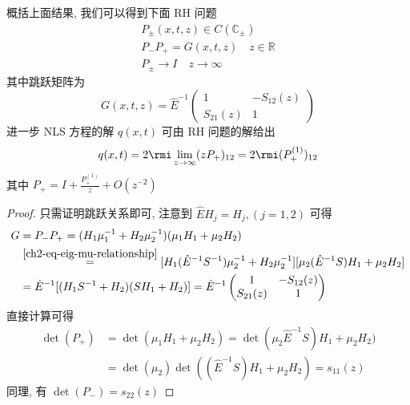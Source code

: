 \begin{definition}
    概括上面结果, 我们可以得到下面 RH 问题
    \begin{align}
        P_{\pm}(x,t,z) \in C(\mathbb{C}_{\pm})  \label{ch2-eq-RHP-1}      \\
        P_{-}P_{+} = G(x,t,z) \quad z \in \mathbb{R} \label{ch2-eq-RHP-2} \\
        P_{\pm} \to I \quad z \to \infty \label{ch2-eq-RHP-3}
    \end{align}
    其中跳跃矩阵为
    \begin{equation}
        G(x,t,z) = \hat{E}^{-1} \begin{pmatrix}
            1 & -S_{12}(z) \\ S_{21}(z) & 1
        \end{pmatrix}
    \end{equation}
    进一步 NLS 方程的解 $ q(x,t) $ 可由 RH 问题的解给出
    \begin{equation}
        q(x,t) = 2 \rmi \lim_{z \to \infty} (z P_{+})_{12} = 2 \rmi (P_{+}^{(1)})_{12}
    \end{equation}
    其中 $ P_{+} = I + \frac{P_{+}^{(1)}}{z} + O(z^{-2}) $
\end{definition}
\begin{proof}
    只需证明跳跃关系即可, 注意到 $ \hat{E} H_{j} = H_{j}, (j=1,2) $ 可得
    \begin{equation}
        \begin{aligned}
            G & = P_{-}P_{+} = (H_{1} \mu_{1}^{-1} + H_{2} \mu_{2}^{-1})(\mu_{1} H_{1} + \mu_{2} H_{2})                                                                     \\
              & \overset{\eqref{ch2-eq-eig-mu-relationship}}{=} [H_{1}(\hat{E}^{-1} S^{-1})\mu_{2}^{-1} + H_{2}\mu_{2}^{-1}]  [\mu_{2}(\hat{E}^{-1} S)H_{1} + \mu_{2}H_{2}] \\
              & = \hat{E}^{-1} [(H_{1}S^{-1} + H_2)(SH_{1} + H_{2})] = \hat{E}^{-1} \begin{pmatrix}
                                                                                        1 & -S_{12}(z) \\ S_{21}(z) & 1
                                                                                    \end{pmatrix}
        \end{aligned}
    \end{equation}
    直接计算可得
    \begin{equation}
        \begin{aligned}
            \det(P_{+}) & = \det(\mu_{1}H_{1} + \mu_{2} H_{2}) = \det(\mu_{2} \hat{E}^{-1} S) H_{1} + \mu_{2}H_{2}) \\
                        & =\det(\mu_{2}) \det((\hat{E}^{-1} S) H_{1} + \mu_{2}H_{2}) = s_{11}(z)
        \end{aligned}
    \end{equation}
    同理, 有 $ \det(P_{-}) = s_{22}(z) $
\end{proof}


